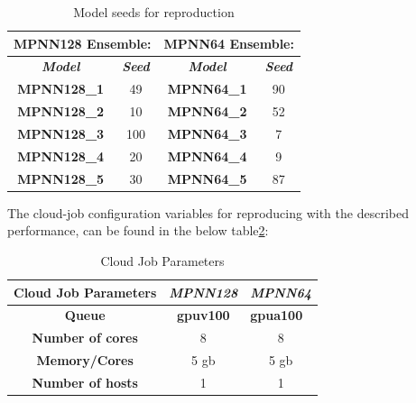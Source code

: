 \begin{table}[H]
    \centering
    \caption{Model seeds for reproduction}
    \label{tab:seeds}
    \begin{tabular}{|cc|cc|}
        \hline
        \multicolumn{2}{|c|}{\textbf{MPNN128 Ensemble:}} & \multicolumn{2}{c|}{\textbf{MPNN64 Ensemble:}}                                                                         \\ \hline
        \multicolumn{1}{|c|}{\textit{\textbf{Model}}}    & \textit{\textbf{Seed}}                         & \multicolumn{1}{c|}{\textit{\textbf{Model}}} & \textit{\textbf{Seed}} \\ \hline
        \multicolumn{1}{|c|}{\textbf{MPNN128\_1}}        & 49                                             & \multicolumn{1}{c|}{\textbf{MPNN64\_1}}      & 90                     \\ \hline
        \multicolumn{1}{|c|}{\textbf{MPNN128\_2}}        & 10                                             & \multicolumn{1}{c|}{\textbf{MPNN64\_2}}      & 52                     \\ \hline
        \multicolumn{1}{|c|}{\textbf{MPNN128\_3}}        & 100                                            & \multicolumn{1}{c|}{\textbf{MPNN64\_3}}      & 7                      \\ \hline
        \multicolumn{1}{|c|}{\textbf{MPNN128\_4}}        & 20                                             & \multicolumn{1}{c|}{\textbf{MPNN64\_4}}      & 9                      \\ \hline
        \multicolumn{1}{|c|}{\textbf{MPNN128\_5}}        & 30                                             & \multicolumn{1}{c|}{\textbf{MPNN64\_5}}      & 87                     \\ \hline
    \end{tabular}
\end{table}

The cloud-job configuration variables for reproducing with the described performance,
can be found in the below table\ref{tab:cloud-job-param}:

\begin{table}[]
    \centering
    \caption{Cloud Job Parameters}
    \label{tab:cloud-job-param}
    \begin{tabular}{|c|c|c|}
        \hline
        \textbf{Cloud Job Parameters} & \textit{\textbf{MPNN128}} & \textit{\textbf{MPNN64}}              \\ \hline
        \textbf{Queue}                & \textbf{gpuv100}          & \multicolumn{1}{l|}{\textbf{gpua100}} \\ \hline
        \textbf{Number of cores}      & 8                         & 8                                     \\ \hline
        \textbf{Memory/Cores}         & 5 gb                      & 5 gb                                  \\ \hline
        \textbf{Number of hosts}      & 1                         & 1                                     \\ \hline
    \end{tabular}
\end{table}

\newpage
